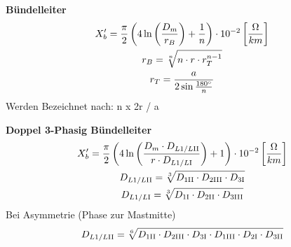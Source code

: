 \begin{itemize}
\textbf{Bündelleiter}
\begin{gather*}
    X_{b}' = \frac{\pi}{2} \left( 4 \ln \left( \frac{D_{m}}{r_{B}}\right) + \frac{1}{n} \right) \cdot 10 ^{-2}   \left[\frac{\Omega}{km}\right]\\
    r_{B} = \sqrt[n]{n \cdot r \cdot r_{T}^{n-1}}\\
    r_{T} = \frac{a}{2 \sin \frac{180 \degree}{n}}
\end{gather*}
Werden Bezeichnet nach: n x 2r / a

\textbf{Doppel 3-Phasig Bündelleiter}
\begin{gather*}
    X_{b}' = \frac{\pi}{2} \left( 4 \ln \left( \frac{D_{m} \cdot D_{L1/L\RN{2}}}{r \cdot D_{L1/L\RN{1}}}\right) + 1 \right) \cdot 10 ^{-2}   \left[\frac{\Omega}{km}\right]\\
    D_{L1/L\RN{2}} = \sqrt[3]{D_{1\RN{2}} \cdot D_{2\RN{3}} \cdot D_{3\RN{1}}}\\
    D_{L1/L\RN{1}} = \sqrt[3]{D_{1\RN{1}} \cdot D_{2\RN{2}} \cdot D_{3\RN{3}}}
\end{gather*}
Bei Asymmetrie (Phase zur Mastmitte)
\begin{equation*}
    D_{L1/L\RN{2}} = \sqrt[6]{D_{1\RN{2}} \cdot D_{2\RN{3}} \cdot D_{3\RN{1}} \cdot D_{1\RN{3}} \cdot D_{2\RN{1}} \cdot D_{3\RN{2}}}
\end{equation*}
\end{itemize}
\clearpage
